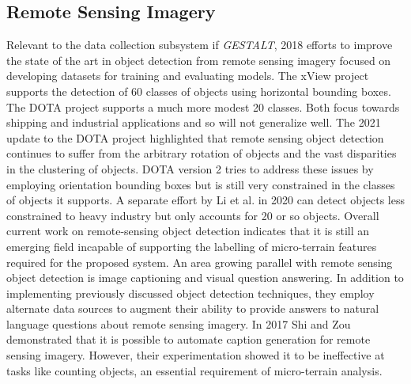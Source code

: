 \subsection{Remote Sensing Imagery}
Relevant to the data collection subsystem if \textit{GESTALT}, 2018 efforts to improve the state of the art in object detection from remote sensing imagery focused on developing datasets for training and evaluating models. 
The xView project supports the detection of 60 classes of objects\cite{Lam2018} using horizontal bounding boxes. The DOTA project supports a much more modest 20 classes\cite{Xia2018}. 
Both focus towards shipping and industrial applications and so will not generalize well. The 2021 update to the DOTA project highlighted that remote sensing object detection continues to suffer from the arbitrary rotation of objects and the vast disparities in the clustering of objects\cite{Ding2021}. 
DOTA version 2 tries to address these issues by employing orientation bounding boxes but is still very constrained in the classes of objects it supports. 
A separate effort by Li et al. in 2020 can detect objects less constrained to heavy industry but only accounts for 20 or so objects\cite{Li2020}. 
Overall current work on remote-sensing object detection indicates that it is still an emerging field incapable of supporting the labelling of micro-terrain features required for the proposed system. 
An area growing parallel with remote sensing object detection is image captioning and visual question answering. 
In addition to implementing previously discussed object detection techniques, they employ alternate data sources to augment their ability to provide answers to natural language questions about remote sensing imagery. 
In 2017 Shi and Zou demonstrated that it is possible to automate caption generation for remote sensing imagery. However, their experimentation showed it to be ineffective at tasks like counting objects\cite{Shi2017}, an essential requirement of micro-terrain analysis.

